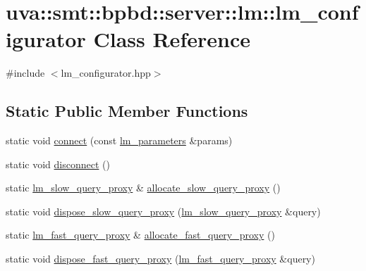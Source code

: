 \hypertarget{classuva_1_1smt_1_1bpbd_1_1server_1_1lm_1_1lm__configurator}{}\section{uva\+:\+:smt\+:\+:bpbd\+:\+:server\+:\+:lm\+:\+:lm\+\_\+configurator Class Reference}
\label{classuva_1_1smt_1_1bpbd_1_1server_1_1lm_1_1lm__configurator}


{\ttfamily \#include $<$lm\+\_\+configurator.\+hpp$>$}

\subsection*{Static Public Member Functions}
\begin{DoxyCompactItemize}
\item 
static void \hyperlink{classuva_1_1smt_1_1bpbd_1_1server_1_1lm_1_1lm__configurator_a3e5a23be42479262dafafcd723f740f3}{connect} (const \hyperlink{structuva_1_1smt_1_1bpbd_1_1server_1_1lm_1_1lm__parameters}{lm\+\_\+parameters} \&params)
\item 
static void \hyperlink{classuva_1_1smt_1_1bpbd_1_1server_1_1lm_1_1lm__configurator_a980b322d56a0610388ca5a1ec12b98c4}{disconnect} ()
\item 
static \hyperlink{classuva_1_1smt_1_1bpbd_1_1server_1_1lm_1_1proxy_1_1lm__slow__query__proxy}{lm\+\_\+slow\+\_\+query\+\_\+proxy} \& \hyperlink{classuva_1_1smt_1_1bpbd_1_1server_1_1lm_1_1lm__configurator_a953ecb5d930125f6ca28f104f8921f69}{allocate\+\_\+slow\+\_\+query\+\_\+proxy} ()
\item 
static void \hyperlink{classuva_1_1smt_1_1bpbd_1_1server_1_1lm_1_1lm__configurator_ab4a93e6db74a28801aa7268cdfc47163}{dispose\+\_\+slow\+\_\+query\+\_\+proxy} (\hyperlink{classuva_1_1smt_1_1bpbd_1_1server_1_1lm_1_1proxy_1_1lm__slow__query__proxy}{lm\+\_\+slow\+\_\+query\+\_\+proxy} \&query)
\item 
static \hyperlink{classuva_1_1smt_1_1bpbd_1_1server_1_1lm_1_1proxy_1_1lm__fast__query__proxy}{lm\+\_\+fast\+\_\+query\+\_\+proxy} \& \hyperlink{classuva_1_1smt_1_1bpbd_1_1server_1_1lm_1_1lm__configurator_a2335406b3c20748f4fe89f0ed5056287}{allocate\+\_\+fast\+\_\+query\+\_\+proxy} ()
\item 
static void \hyperlink{classuva_1_1smt_1_1bpbd_1_1server_1_1lm_1_1lm__configurator_a982d011a50fe31a2b984a139f13c1e1d}{dispose\+\_\+fast\+\_\+query\+\_\+proxy} (\hyperlink{classuva_1_1smt_1_1bpbd_1_1server_1_1lm_1_1proxy_1_1lm__fast__query__proxy}{lm\+\_\+fast\+\_\+query\+\_\+proxy} \&query)
\end{DoxyCompactItemize}


